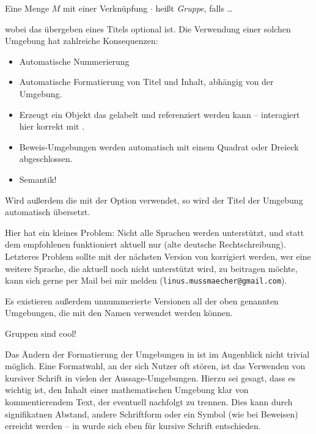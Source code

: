 \begin{latexlisting}
	\begin{definition}[Gruppe]
		Eine Menge $M$ mit einer Verknüpfung $\cdot$ heißt \emph{Gruppe}, falls \dots
	\end{definition}
\end{latexlisting}
wobei das übergeben eines Titels optional ist.
Die Verwendung einer solchen Umgebung hat zahlreiche Konsequenzen:
\begin{itemize}
	\item Automatische Nummerierung
	\item Automatische Formatierung von Titel und Inhalt, abhängig von der Umgebung.
	\item Erzeugt ein Objekt das gelabelt und referenziert werden kann --  interagiert hier korrekt mit .
	\item Beweis-Umgebungen werden automatisch mit einem Quadrat oder Dreieck abgeschlossen.
	\item Semantik!
\end{itemize}
Wird außerdem die  mit der Option  verwendet, so wird der Titel der Umgebung automatisch übersetzt.
\begin{latexlisting}
	\usepackage[german,string]{babel}
	\usepackage{nchairx}
\end{latexlisting}
Hier hat  ein kleines Problem:
Nicht alle Sprachen werden unterstützt, und statt dem empfohlenen  funktioniert aktuell nur  (alte deutsche Rechtschreibung).
Letzteres Problem sollte mit der nächsten Version von  korrigiert werden, wer eine weitere Sprache, die aktuell noch nicht unterstützt wird, zu  beitragen möchte, kann sich gerne per Mail bei mir melden (\texttt{linus.mussmaecher@gmail.com}).

Es existieren außerdem unnummerierte Versionen all der oben genannten Umgebungen, die mit den Namen  verwendet werden können.
\begin{latexlisting}
	\begin{nnremark}
		Gruppen sind cool!
	\end{nnremark}
\end{latexlisting}
Das Ändern der Formatierung der Umgebungen in  ist im Augenblick nicht trivial möglich.
Eine Formatwahl, an der sich Nutzer oft stören, ist das Verwenden von kursiver Schrift in vielen der Aussage-Umgebungen.
Hierzu sei gesagt, dass es wichtig ist, den Inhalt einer mathematischen Umgebung klar von kommentierendem Text, der eventuell nachfolgt zu trennen.
Dies kann durch signifikatnen Abstand, andere Schriftform oder ein Symbol (wie bei Beweisen) erreicht werden -- in  wurde sich eben für kursive Schrift entschieden.

